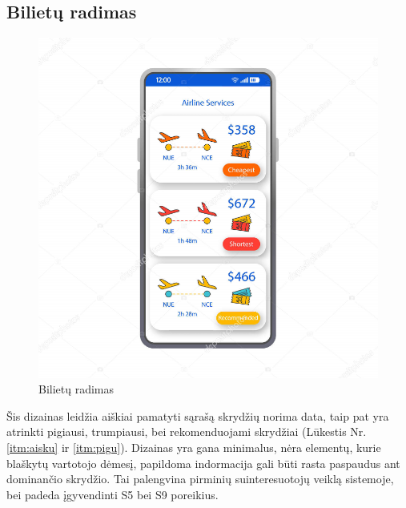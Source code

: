 \documentclass{VUMIFPSkursinis}
\begin{document}
\subsection{Bilietų radimas}
\begin{figure}[H]
    \centering
    \includegraphics[scale=0.8]{img/deposit.png}
    \caption{Bilietų radimas}
    \label{img:radimas1}
\end{figure}
Šis dizainas leidžia aiškiai pamatyti sąrašą skrydžių norima data, taip pat yra atrinkti pigiausi, trumpiausi, bei rekomenduojami skrydžiai  (Lūkestis Nr. \ref{itm:aisku} ir  \ref{itm:pigu}). Dizainas yra gana minimalus, nėra elementų, kurie blaškytų vartotojo dėmesį, papildoma indormacija gali būti rasta paspaudus ant dominančio skrydžio. Tai palengvina pirminių suinteresuotojų veiklą sistemoje, bei padeda įgyvendinti S5 bei S9 poreikius. 

\newpage
\end{document}
